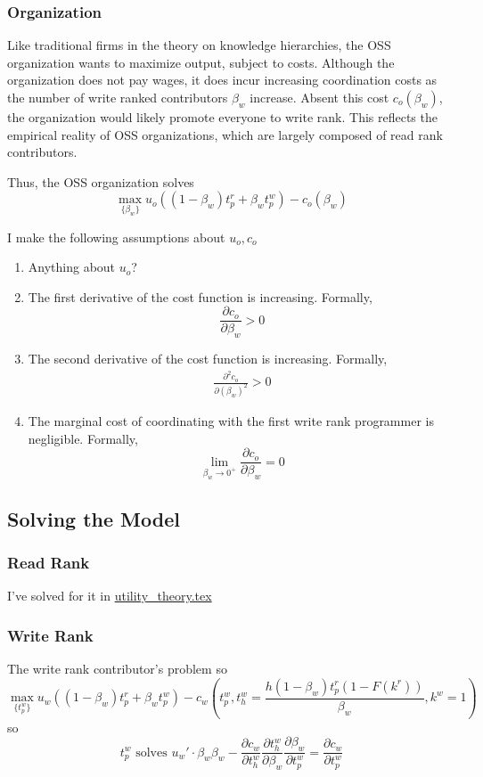 \documentclass[source/paper/main.tex]{subfiles}
\begin{document}
\subsubsection{Organization}
Like traditional firms in the theory on knowledge hierarchies, the OSS organization wants to maximize output, subject to costs. Although the organization does not pay wages, it does incur increasing coordination costs as the number of write ranked contributors $\beta_w$ increase. Absent this cost $c_o(\beta_w)$, the organization would likely promote everyone to write rank. This reflects the empirical reality of OSS organizations, which are largely composed of read rank contributors. 

Thus, the OSS organization solves
$$\max_{\{\beta_w\}} u_o\left((1-\beta_w) t_p^r + \beta_w t_p^w\right) - c_o(\beta_w)$$ 

I make the following assumptions about $u_o, c_o$
\begin{enumerate}
    \item Anything about $u_o$?
    \item The first derivative of the cost function is increasing. Formally, 
    $$\frac{\partial c_o}{\partial \beta_w}>0$$
    \item  The second derivative of the cost function is increasing. Formally, 
    \begin{align}
        \frac{\partial^2 c_o}{\partial (\beta_w)^2}>0 \label{org_concave_cost}
    \end{align}
    \item The marginal cost of coordinating with the first write rank programmer is negligible. Formally,
    $$\lim_{\beta_w \to 0^+} \frac{\partial c_o}{\partial \beta_w} = 0 $$
\end{enumerate}

\subsection{Solving the Model}
\subsubsection{Read Rank}
I've solved for it in \href{run:source/paper/utility_theory.tex}{utility\_theory.tex}

\subsubsection{Write Rank}
The write rank contributor's problem so
$$\max_{\{t_p^w\}} u_w\left((1-\beta_w) t_p^r + \beta_w t_p^w \right) - c_w\left(t_p^w, t_h^w = \frac{ h (1-\beta_w) t_p^r(1-F(k^r))}{\beta_w}, k^w = 1\right)$$
so $$t_p^w \text{ solves } u_w' \cdot \beta_w \beta_w - \frac{\partial c_w}{\partial t_h^w} \frac{\partial t_h^w}{\partial \beta_w}\frac{\partial \beta_w}{\partial t_p^w} = \frac{\partial c_w}{\partial t_p^w} $$
\end{document}
